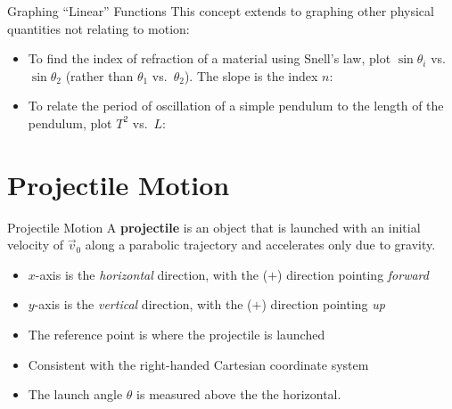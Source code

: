 \documentclass[12pt,compress,aspectratio=169,dvipsnames]{beamer}
\begin{document}
\begin{frame}{Graphing ``Linear'' Functions}
  This concept extends to graphing other physical quantities not relating to
  motion:
  \begin{itemize}
  \item To find the index of refraction of a material using Snell's law, plot
    $\sin\theta_i$ vs.\ $\sin\theta_2$ (rather than $\theta_1$ vs.\ $\theta_2$).
    The slope is the index $n$:

  \item To relate the period of oscillation of a simple pendulum to the length
    of the pendulum, plot $T^2$ vs.\ $L$:

  \end{itemize}
\end{frame}



\section{Projectile Motion}

\begin{frame}{Projectile Motion}
  A \textbf{projectile} is an object that is launched with an initial velocity
  of $\vec v_0$ along a parabolic trajectory and accelerates only due to
  gravity.
  \begin{center}
  \end{center}
  \begin{itemize}
  \item $x$-axis is the \emph{horizontal} direction, with the ($+$) direction
    pointing \emph{forward}
  \item $y$-axis is the \emph{vertical} direction, with the ($+$) direction
    pointing \emph{up}
  \item The reference point is where the projectile is launched
  \item Consistent with the right-handed Cartesian coordinate system
  \item The launch angle $\theta$ is measured above the the horizontal.
  \end{itemize}
\end{frame}
\end{document}
